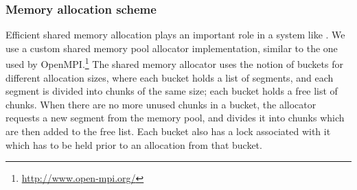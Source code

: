 


\subsubsection{Memory allocation scheme}  

Efficient shared memory allocation plays an important role in a system
like \vx.  We use a custom shared memory pool allocator
implementation, similar to the one used by
OpenMPI.\footnote{\url{http://www.open-mpi.org/}} The shared memory
allocator uses the notion of buckets for different allocation sizes,
where each bucket holds a list of segments, and each segment is
divided into chunks of the same size; each bucket holds a free list of
chunks.  When there are no more unused chunks in a bucket, the
allocator requests a new segment from the memory pool, and divides it
into chunks which are then added to the free list. Each bucket also
has a lock associated with it which has to be held prior to an
allocation from that bucket. 

